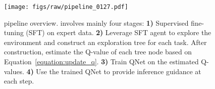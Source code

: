 \begin{figure}
    \centering
    \texttt{[image: figs/raw/pipeline\_0127.pdf]}
    \vspace{-10pt}
    \caption{{\ours} pipeline overview. {\ours} involves mainly four stages: \textbf{1)} Supervised fine-tuning (SFT) on expert data. \textbf{2)} Leverage SFT agent to explore the environment and construct an exploration tree for each task. After construction, estimate the Q-value of each tree node based on Equation~\ref{equation:update_q}. \textbf{3)} Train QNet on the estimated Q-values. \textbf{4)} Use the trained QNet to provide inference guidance at each step.}
    \vspace{-16pt}
    \label{fig:pipeline}
\end{figure}